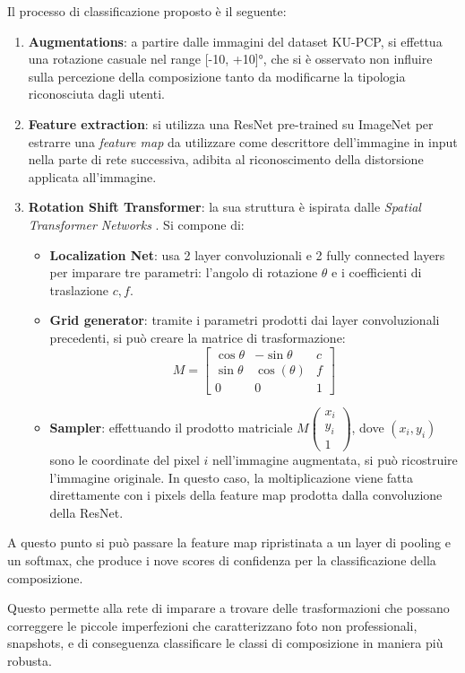 Il processo di classificazione proposto è il seguente:
\begin{enumerate}
    \item \textbf{Augmentations}: a partire dalle immagini del dataset KU-PCP, si effettua una rotazione casuale nel range [-10, +10]°, che si è osservato non influire sulla percezione della composizione tanto da modificarne la tipologia riconosciuta dagli utenti.
    \item \textbf{Feature extraction}: si utilizza una ResNet pre-trained su ImageNet per estrarre una \textit{feature map} da utilizzare come descrittore dell'immagine in input nella parte di rete successiva, adibita al riconoscimento della distorsione applicata all'immagine.
    \item \textbf{Rotation Shift Transformer}: la sua struttura è ispirata dalle \textit{Spatial Transformer Networks} \cite{STN}. Si compone di:
    \begin{itemize}
        \item \textbf{Localization Net}: usa 2 layer convoluzionali e 2 fully connected layers per imparare tre parametri: l'angolo di rotazione \(\theta\) e i coefficienti di traslazione \(c, f\).
\item \textbf{Grid generator}: tramite i parametri prodotti dai layer convoluzionali precedenti, si può creare la matrice di trasformazione:
\[M = \begin{bmatrix}
\cos{\theta} & -\sin{\theta} & c \\
\sin{\theta} & \cos(\theta) & f \\
0 & 0 & 1
\end{bmatrix}\]
\item \textbf{Sampler}: effettuando il prodotto matriciale \(M \begin{pmatrix} x_i \\ y_i \\ 1 \end{pmatrix} \), dove \((x_i, y_i)\) sono le coordinate del pixel \(i\) nell'immagine augmentata, si può ricostruire l'immagine originale. In questo caso, la moltiplicazione viene fatta direttamente con i pixels della feature map prodotta dalla convoluzione della ResNet.
    \end{itemize}
\end{enumerate}
A questo punto si può passare la feature map ripristinata a un layer di pooling e un softmax, che produce i nove scores di confidenza per la classificazione della composizione.

Questo permette alla rete di imparare a trovare delle trasformazioni che possano correggere le piccole imperfezioni che caratterizzano foto non professionali, snapshots, e di conseguenza classificare le classi di composizione in maniera più robusta.

